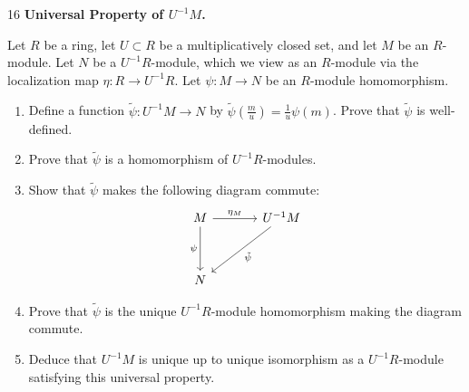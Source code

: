 \documentclass[Notebook.tex]{subfiles}
\begin{document}
\newpage 

\begin{problem}{16}
	\textbf{Universal Property of $U^{-1}M$.} 
	
	Let $R$ be a ring, let $U\subset R$ be a multiplicatively closed set, and let $M$ be an $R$-module. Let $N$ be a $U^{-1}R$-module, which we view as an $R$-module via the localization map $\eta:R\to U^{-1}R$. Let $\psi:M\to N$ be an $R$-module homomorphism.
	\begin{enumerate}
		\item Define a function $\tilde{\psi}:U^{-1}M\to N$ by $\tilde{\psi}(\frac{m}{u})=\frac{1}{u}\psi(m)$. Prove that $\tilde{\psi}$ is well-defined.
		\item Prove that $\tilde{\psi}$ is a homomorphism of $U^{-1}R$-modules.
		\item Show that $\tilde{\psi}$ makes the following diagram commute:
		\[
		\begin{tikzcd}[row sep = 3.5em, column sep = 3.5em]
		M \arrow[r, "\eta_M"] \arrow[d, swap, "\psi"] & U^{-1}M \arrow[dl, "\tilde{\psi}"] \\
		N &
		\end{tikzcd}
		\]
		\item Prove that $\tilde{\psi}$ is the unique $U^{-1}R$-module homomorphism making the diagram commute.
		\item Deduce that $U^{-1}M$ is unique up to unique isomorphism as a $U^{-1}R$-module satisfying this universal property.
	\end{enumerate}
\end{problem}
\end{document}
